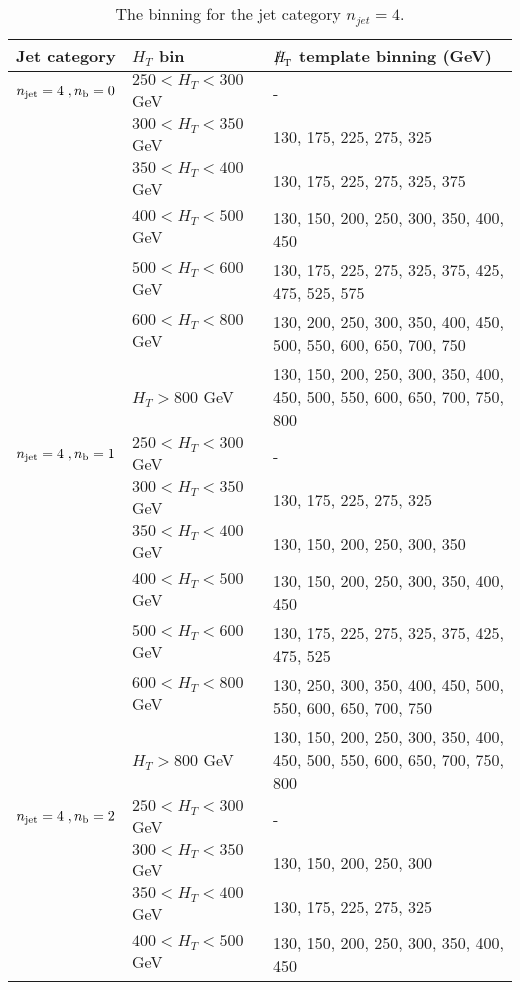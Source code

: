 \begin{table}[h!]
\begin{tabular}{ lll }
  \end{tabular}
\end{table}



\begin{table}[h!]
  \scriptsize
  \centering
  \caption{The \MHT binning for the jet category $n_{jet} = 4$. 
  \label{tab:mhtBins_eq4j}}
  \begin{tabular}{ lll }
    Jet category & $H_{T}$ bin & $\MHT$ template binning (GeV) \\ \hline

    \hline
    $n_{\text{jet}} = 4 \;, n_{\text{b}} = 0 $ & $250 < H_{T} < 300$ GeV & - \\ 
     & $300 < H_{T} < 350$ GeV & 130, 175, 225, 275, 325 \\ 
     & $350 < H_{T} < 400$ GeV & 130, 175, 225, 275, 325, 375 \\ 
     & $400 < H_{T} < 500$ GeV & 130, 150, 200, 250, 300, 350, 400, 450 \\ 
     & $500 < H_{T} < 600$ GeV & 130, 175, 225, 275, 325, 375, 425, 475, 525, 575 \\ 
     & $600 < H_{T} < 800$ GeV & 130, 200, 250, 300, 350, 400, 450, 500, 550, 600, 650, 700, 750 \\ 
     & $H_{T} > 800$ GeV & 130, 150, 200, 250, 300, 350, 400, 450, 500, 550, 600, 650, 700, 750, 800 \\ 
    \hline
    $n_{\text{jet}} = 4 \;, n_{\text{b}} = 1$ & $250 < H_{T} < 300$ GeV & - \\ 
     & $300 < H_{T} < 350$ GeV & 130, 175, 225, 275, 325 \\ 
     & $350 < H_{T} < 400$ GeV & 130, 150, 200, 250, 300, 350 \\ 
     & $400 < H_{T} < 500$ GeV & 130, 150, 200, 250, 300, 350, 400, 450 \\ 
     & $500 < H_{T} < 600$ GeV & 130, 175, 225, 275, 325, 375, 425, 475, 525 \\ 
     & $600 < H_{T} < 800$ GeV & 130, 250, 300, 350, 400, 450, 500, 550, 600, 650, 700, 750 \\ 
     & $H_{T} > 800$ GeV & 130, 150, 200, 250, 300, 350, 400, 450, 500, 550, 600, 650, 700, 750, 800 \\ 
    \hline
    $n_{\text{jet}} = 4 \;, n_{\text{b}} = 2 $ & $250 < H_{T} < 300$ GeV & - \\ 
     & $300 < H_{T} < 350$ GeV & 130, 150, 200, 250, 300 \\ 
     & $350 < H_{T} < 400$ GeV & 130, 175, 225, 275, 325 \\ 
     & $400 < H_{T} < 500$ GeV & 130, 150, 200, 250, 300, 350, 400, 450 \\ 

\end{tabular}
\end{table}

